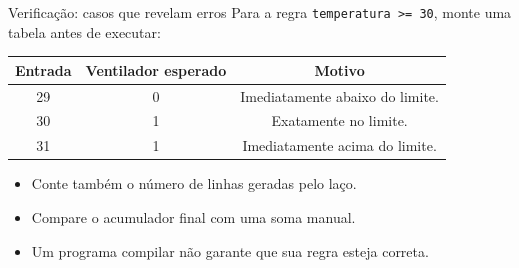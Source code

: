 \begin{frame}{Verificação: casos que revelam erros}
Para a regra \texttt{temperatura >= 30}, monte uma tabela antes de executar:
\begin{center}
\begin{tabular}{ccc}
\toprule
Entrada & Ventilador esperado & Motivo \\
\midrule
29 & 0 & Imediatamente abaixo do limite. \\
30 & 1 & Exatamente no limite. \\
31 & 1 & Imediatamente acima do limite. \\
\bottomrule
\end{tabular}
\end{center}
\begin{itemize}
\item Conte também o número de linhas geradas pelo laço.
\item Compare o acumulador final com uma soma manual.
\item Um programa compilar não garante que sua regra esteja correta.
\end{itemize}
\end{frame}

